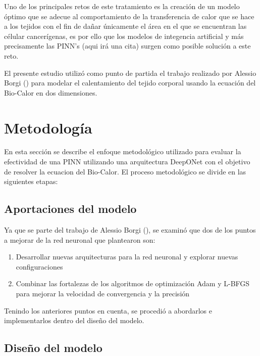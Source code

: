 \documentclass[
  spanish,
  us-letterpaper,
  DIV=11,
  numbers=noendperiod]{scrreprt}
\providecommand{\tightlist}{%
  \setlength{\itemsep}{0pt}\setlength{\parskip}{0pt}}
\theoremstyle{plain}
\theoremstyle{definition}
\theoremstyle{remark}
\begin{document}
Uno de los principales retos de este tratamiento es la creación de un
modelo óptimo que se adecue al comportamiento de la transferencia de
calor que se hace a los tejidos con el fin de dañar únicamente el área
en el que se encuentran las célular cancerígenas, es por ello que los
modelos de integencia artificial y más precisamente las PINN's (aqui irá
una cita) surgen como posible solución a este reto.

El presente estudio utilizó como punto de partida el trabajo realizado
por Alessio Borgi () para modelar el
calentamiento del tejido corporal usando la ecuación del Bio-Calor en
dos dimensiones.

\chapter{Metodología}\label{metodologuxeda}

En esta sección se describe el enfoque metodológico utilizado para
evaluar la efectividad de una PINN utilizando una arquitectura DeepONet
con el objetivo de resolver la ecuacion del Bio-Calor. El proceso
metodológico se divide en las siguientes etapas:

\section{Aportaciones del modelo}\label{aportaciones-del-modelo}

Ya que se parte del trabajo de Alessio Borgi
(), se examinó que dos de los puntos a
mejorar de la red neuronal que plantearon son:

\begin{enumerate}
\def\labelenumi{\arabic{enumi}.}
\tightlist
\item
  Desarrollar nuevas arquitecturas para la red neuronal y explorar
  nuevas configuraciones
\item
  Combinar las fortalezas de los algoritmos de optimización Adam y
  L-BFGS para mejorar la velocidad de convergencia y la precisión
\end{enumerate}

Tenindo los anteriores puntos en cuenta, se procedió a abordarlos e
implementarlos dentro del diseño del modelo.

\section{Diseño del modelo}\label{diseuxf1o-del-modelo}
\end{document}
